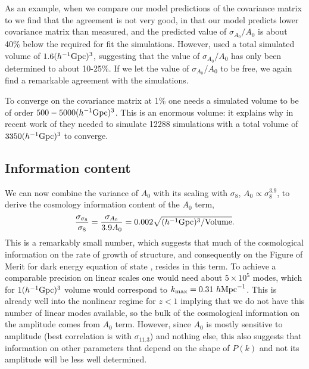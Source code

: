 \documentclass[
  11pt,
  twoside,
  openright,
  titlepage,
  headings=optiontoheadandtoc
]{scrbook}
\begin{document}
As an example, when we compare our model predictions of the covariance matrix to \cite{2012MNRAS.423.2288H} we find that the 
agreement is not very good, in that our model predicts lower covariance matrix than measured, and the predicted value 
of $\sigma_{A_0}/A_0$ is about 40\% below the required for fit the simulations. 
However, \cite{2012MNRAS.423.2288H} used a total simulated volume of $1.6(h^{-1}{\rm Gpc})^3$, suggesting that the 
value of $\sigma_{A_0}/A_0$ has only been determined to about 10-25\%. If we let the value of $\sigma_{A_0}/A_0$
to be free, we again find a remarkable agreement with the simulations. 

To converge on the covariance matrix at 1\% one needs a simulated volume to be of order $500-5000(h^{-1}{\rm Gpc})^3$. 
This is an enormous volume: it explains why in recent work of \cite{2014arXiv1406.2713B} they needed to simulate 
12288 simulations with a total volume of $3350(h^{-1}{\rm Gpc})^3$ to converge. 

\subsection{Information content}

We can now combine the variance of $A_0$ with its scaling with $\sigma_8$, $A_0 \propto \sigma_8^{3.9}$, 
to derive the cosmology information 
content of the $A_0$ term,
\begin{equation}
\dfrac{\sigma_{\sigma_8}}{\sigma_8}=\dfrac{\sigma_{A_0}}{3.9 A_0}=0.002 \sqrt{(h^{-1}{\rm Gpc})^3/{\rm Volume}}.
\label{p2:eqn:var_s8}
\end{equation}
This is a remarkably small number, which suggests that much of the cosmological information on the 
rate of growth of structure, and consequently on the Figure of Merit for dark energy equation of state 
\citep{2010PhRvD..82f3004M}, resides in this term. To achieve a comparable precision on linear scales one would 
need about $5\times 10^5$ modes, which for $1(h^{-1}{\rm Gpc})^3$ volume 
would correspond to $k_{\rm max}=0.31\ h \rm{Mpc}^{-1}$. 
This is already well into the nonlinear regime for $z<1$ implying that we do not have this number of linear modes available, 
so the bulk of the cosmological information on the amplitude comes from $A_0$ term. 
However, since $A_0$ is mostly sensitive to amplitude (best correlation is with $\sigma_{11.3}$) 
and nothing else, this also suggests that information 
on other parameters that depend on the shape of $P(k)$ and not its amplitude will be less well 
determined. 
\end{document}
